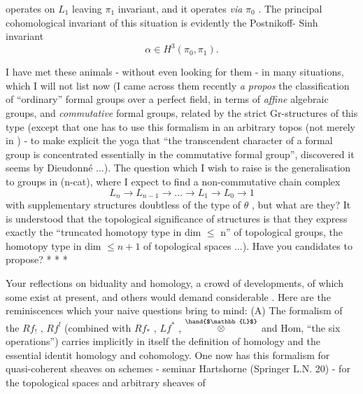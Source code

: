 operates on $L_1$ leaving $\pi_1$ invariant, and it operates \emph{via} $\pi_0$ . The
principal cohomological invariant of this situation is evidently the Postnikoff-%
Sinh invariant
\[ \alpha \in H^3(\pi_0, \pi_1) . \]

I have met these animals - without even looking for them - in many
situations, which I will not list now (I came across them recently \emph{a propos}
the classification of ``ordinary'' formal groups over a perfect field, in terms
of \emph{affine} algebraic groups, and \emph{commutative} formal groups, related by the
strict Gr-structures of this type (except that one has to use this formalism
in an arbitrary topos (not merely in ) - to make explicit the yoga that
``the transcendent character of a formal group is concentrated essentially in
the commutative formal group'', discovered it seems by Dieudonné ...). The
question which I wish to raise is the generalisation to groups in (n-cat),
where I expect to find a non-commutative chain complex
\[ L_n \to L_{n-1} \to \dots \to L_1 \to L_0 \to 1 \]
with supplementary structures doubtless of the type of $\theta$ , but what are they?
It is understood that the topological significance of  structures is that
they express exactly the ``truncated homotopy type in dim $\leq$ n'' of topological
groups,  the homotopy type in dim $\leq n + 1$ of  topological
spaces ...). Have you candidates to propose?
* * *

 Your reflections on biduality and homology,  a crowd of
developments, of which  some  exist at present, and others would demand
 considerable . Here are the reminiscences which your naive
questions bring to mind:
(A) The formalism of the $Rf_!$ , $Rf^!$ (combined with $Rf_*$ , $Lf^*$ , $\overset{\hand{$\mathbb{L}$}}{\otimes}$ and Hom,
``the six operations'') carries implicitly in itself the definition of homology
and the essential identit homology and cohomology. One now
has this formalism for quasi-coherent sheaves on schemes - seminar Hartshorne
(Springer L.N. 20) - for the topological spaces and arbitrary sheaves of
